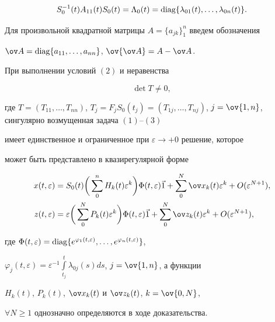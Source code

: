 $$ 


S^{-1}_0(t)A_{11}(t)S_0(t)=\Lambda_0(t)= 


\diag\{\lambda_{01}(t),\dotsc,\lambda_{0n}(t)\}. 


$$ 


 


Для произвольной квадратной матрицы $A=\{a_{jk}\}^n_1$ введем обозначения 


$\ov A=\diag\{a_{11},\dotsc,a_{n n}\}$, $\ov{\ov A}=A-\ov A$. 


 


\begin{thmnonum} 


При выполнении условий $(2)$ и неравенства 


\begin{equation} 


\det T\ne0, 


\end{equation} 


где $T=(T_{11},\dotsc,T_{n n})$, $T_j=F_j S_0(t_j)=(T_{1j},\dotsc, 


T_{n j})$, $j=\ov{1,n}$, сингулярно возмущенная задача $(1)$--$(3)$ 


имеет единственное и ограниченное при $\varepsilon\to+0$ решение, которое 


может быть представлено в квазирегулярной форме 


\begin{align} 


x(t,\varepsilon)&=S_0(t)\bigg(\sum^n_0 H_k(t)\varepsilon^k\bigg) 


\Phi(t,\varepsilon)\Vec 1+\sum^N_0 \ov x_k(t)\varepsilon^k 


+O(\varepsilon^{N+1}), \\ 


% 


z(t,\varepsilon)&=\varepsilon\bigg(\sum^N_0 P_k(t)\varepsilon^k\bigg) 


\Phi(t,\varepsilon)\Vec 1+\sum^N_0\ov z_k(t)\varepsilon^k+ 


O(\varepsilon^{N+1}), 


\end{align} 


где $\Phi(t,\varepsilon)=\diag\{e^{\varphi_1(t,\varepsilon)},\dotsc, 


e^{\varphi_n(t,\varepsilon)}\}$, 


$\varphi_j(t,\varepsilon)=\varepsilon^{-1}\int\limits^t_{t_j} 


\lambda_{0j}(s)d s$, $j=\ov{1,n}$, а функции 


$H_k(t)$, $P_k(t)$, $\ov x_k(t)$ и $\ov z_k(t)$, $k=\ov{0,N}$, 


$\forall N\ge1$ однозначно определяются в ходе доказательства. 


\end{thmnonum} 


